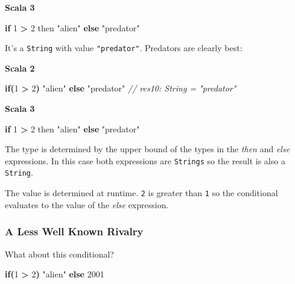 \documentclass[11pt,a5paper,]{book}
\newenvironment{Shaded}{\begin{snugshade}}{\end{snugshade}}
\newcommand{\CommentTok}[1]{\textcolor[rgb]{0.56,0.35,0.01}{\textit{#1}}}
\newcommand{\ControlFlowTok}[1]{\textcolor[rgb]{0.13,0.29,0.53}{\textbf{#1}}}
\newcommand{\DecValTok}[1]{\textcolor[rgb]{0.00,0.00,0.81}{#1}}
\newcommand{\NormalTok}[1]{#1}
\newcommand{\OperatorTok}[1]{\textcolor[rgb]{0.81,0.36,0.00}{\textbf{#1}}}
\newcommand{\StringTok}[1]{\textcolor[rgb]{0.31,0.60,0.02}{#1}}
\begin{document}
\textbf{Scala 3}

\begin{Shaded}
\begin{Highlighting}[]
\ControlFlowTok{if} \DecValTok{1} \OperatorTok{\textgreater{}} \DecValTok{2}\NormalTok{ then }\StringTok{"alien"} \ControlFlowTok{else} \StringTok{"predator"}
\end{Highlighting}
\end{Shaded}

It's a \texttt{String} with value \texttt{"predator"}. Predators are
clearly best:

\textbf{Scala 2}

\begin{Shaded}
\begin{Highlighting}[]
\ControlFlowTok{if}\OperatorTok{(}\DecValTok{1} \OperatorTok{\textgreater{}} \DecValTok{2}\OperatorTok{)} \StringTok{"alien"} \ControlFlowTok{else} \StringTok{"predator"}
\CommentTok{// res10: String = "predator"}
\end{Highlighting}
\end{Shaded}

\textbf{Scala 3}

\begin{Shaded}
\begin{Highlighting}[]
\ControlFlowTok{if} \DecValTok{1} \OperatorTok{\textgreater{}} \DecValTok{2}\NormalTok{ then }\StringTok{"alien"} \ControlFlowTok{else} \StringTok{"predator"}
\end{Highlighting}
\end{Shaded}

The type is determined by the upper bound of the types in the
\emph{then} and \emph{else} expressions. In this case both expressions
are \texttt{Strings} so the result is also a \texttt{String}.

The value is determined at runtime. \texttt{2} is greater than
\texttt{1} so the conditional evaluates to the value of the \emph{else}
expression.

\hypertarget{a-less-well-known-rivalry}{%
\subsubsection{A Less Well Known
Rivalry}\label{a-less-well-known-rivalry}}

What about this conditional?

\begin{Shaded}
\begin{Highlighting}[]
\ControlFlowTok{if}\OperatorTok{(}\DecValTok{1} \OperatorTok{\textgreater{}} \DecValTok{2}\OperatorTok{)} \StringTok{"alien"} \ControlFlowTok{else} \DecValTok{2001}
\end{Highlighting}
\end{Shaded}
\end{document}
